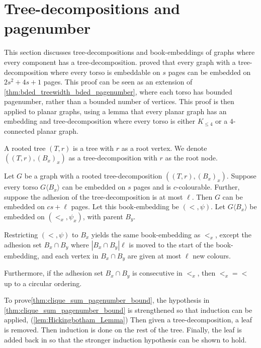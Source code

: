 \section{Tree-decompositions and pagenumber}\label{sec:BoundedPagenumber}
This section discusses tree-decompositions and book-embeddings of graphs where every component has a tree-decomposition. \textcite{hickingbothamStackNumberCliqueSum2023} proved that every graph with a tree-decomposition where every torso is embeddable on $s$ pages can be embedded on $2s^2 + 4s + 1$ pages. This proof can be seen as an extension of \cref{thm:bded_treewidth_bded_pagenumber}, where each torso has bounded pagenumber, rather than a bounded number of vertices. This proof is then applied to planar graphs, using a lemma that every planar graph has an embedding and tree-decomposition where every torso is either $K_{\leq 4}$ or a $4$-connected planar graph. 

A rooted tree $(T, r)$ is a tree with $r$ as a root vertex. We denote $ ((T,r), (B_x)_x)$ as a tree-decomposition with $r$ as the root node. 
\begin{theorem}\label{thm:clique_sum_pagenumber_bound}
	Let \(G\) be a graph with a rooted tree-decomposition \(((T, r), (B_x)_x)\). Suppose every torso \(G \langle B_x \rangle\) can be embedded on \(s\) pages and is \(c\)-colourable. Further, suppose the adhesion of the tree-decomposition is at most \(\ell\).
	Then $G$ can be embedded on \( cs + \ell \) pages. Let this book-embedding be $(<, \psi)$. Let $G\langle B_x \rangle$ be embedded on $(<_x, \psi_x)$, with parent $B_y$. 
	
	Restricting $(<, \psi)$ to $B_x$ yields the same book-embedding as $<_x$, except the adhesion set $B_x \cap B_y$ where $|B_x \cap B_y|\ell$ is moved to the start of the book-embedding, and each vertex in $B_x \cap B_y$ are given at most $\ell$ new colours. 
	
	Furthermore, if the adhesion set $B_x \cap B_y$ is consecutive in $<_x$, then $<_x = <$ up to a circular ordering.
\end{theorem}

To prove\cref{thm:clique_sum_pagenumber_bound}, the hypothesis in \cref{thm:clique_sum_pagenumber_bound} is strengthened so that induction can be applied, (\cref{lem:Hickingbotham_Lemma}) Then given a tree-decomposition, a leaf is removed. Then induction is done on the rest of the tree. Finally, the leaf is added back in so that the stronger induction hypothesis can be shown to hold. 

